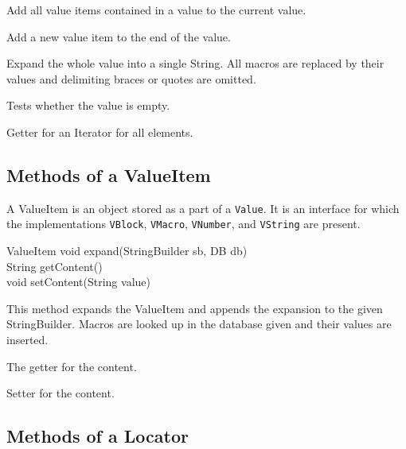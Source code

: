 \begin{methods}
    Add all value items contained in a value to the current value.

    Add a new value item to the end of the value.

    Expand the whole value into a single String. All macros are replaced by
    their values and delimiting braces or quotes are omitted.

    Tests whether the value is empty.

    Getter for an Iterator for all elements.
\end{methods}


\subsection{Methods of a ValueItem}\label{sec:groovy.valueitem}

A ValueItem is an object stored as a part of a \texttt{Value}. It is an
interface for which the implementations \texttt{VBlock}, \texttt{VMacro},
\texttt{VNumber}, and \texttt{VString} are present. 

\begin{UMLclass}{ValueItem}
  void expand(StringBuilder sb, DB db)\\
  String getContent()\\
  void setContent(String value)
\end{UMLclass}

\begin{methods}

    This method expands the ValueItem and appends the expansion to the given
    StringBuilder. Macros are looked up in the database given and their
    values are inserted.

    The getter for the content.

    Setter for the content.

\end{methods}


\subsection{Methods of a Locator}\label{sec:groovy.locator}

